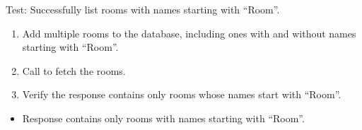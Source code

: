 \documentclass[letterpaper,10pt,english]{sphinxmanual}
\begin{document}
\begin{fulllineitems}
\label{\detokenize{test:test.test_room.test_list_rooms_room_success}}
\pysigstartsignatures
\pysiglinewithargsret
{}
{}
{}
\pysigstopsignatures
\sphinxAtStartPar
Test: Successfully list rooms with names starting with “Room”.
\begin{description}
\begin{enumerate}
%
\item {} 
\sphinxAtStartPar
Add multiple rooms to the database, including ones with and without names starting with “Room”.

\item {} 
\sphinxAtStartPar
Call  to fetch the rooms.

\item {} 
\sphinxAtStartPar
Verify the response contains only rooms whose names start with “Room”.

\end{enumerate}

\begin{itemize}
\item {} 
\sphinxAtStartPar
Response contains only rooms with names starting with “Room”.

\end{itemize}

\end{description}

\end{fulllineitems}

\end{document}
